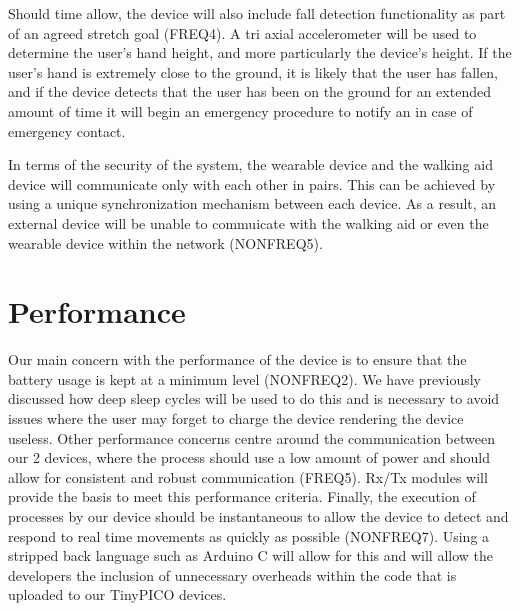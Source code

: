         Should time allow, the device will also include fall detection functionality as part of an agreed stretch goal (FREQ4). A tri axial accelerometer will be used to determine the user's hand height, and
        more particularly the device's height. If the user's hand is extremely close to the ground, it is likely that
        the user has fallen, and if the device detects that the user has been on the ground for an extended amount of time
        it will begin an emergency procedure to notify an in case of emergency contact.

        In terms of the security of the system, the wearable device and the walking aid device will communicate only with each other in pairs. This can be achieved by using a unique synchronization mechanism between each device. As a result, an external device will be unable to commuicate with the walking aid or even the wearable device within the network (NONFREQ5).

    \section{Performance}

        Our main concern with the performance of the device is to ensure that the battery usage is kept at a minimum level (NONFREQ2). We have previously discussed how deep sleep cycles will be used to do this and is necessary to avoid issues where the user may forget to charge the device rendering the device useless. Other performance concerns centre around the communication between our 2 devices, where the process should use a low amount of power and should allow for consistent and robust communication (FREQ5). Rx/Tx modules will provide the basis to meet this performance criteria. Finally, the execution of processes by our device should be instantaneous to allow the device to detect and respond to real time movements as quickly as possible (NONFREQ7). Using a stripped back language such as Arduino C will allow for this and will allow the developers the inclusion of unnecessary overheads within the code that is uploaded to our TinyPICO devices.
